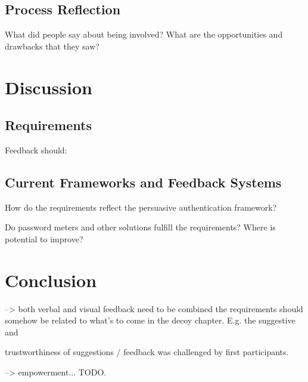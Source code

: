 \subsection{Process Reflection}
What did people say about being involved? What are the opportunities and drawbacks that they saw?
	
\section{Discussion}

\subsection{Requirements}
Feedback should:



\subsection{Current Frameworks and Feedback Systems}
How do the requirements reflect the persuasive authentication framework?

Do password meters and other solutions fulfill the requirements?
Where is potential to improve?



\section{Conclusion}



--> both verbal and visual feedback need to be combined
the requirements should somehow be related to what's to come in the decoy chapter. E.g. the suggestive and 

trustworthiness of suggestions / feedback was challenged by first participants.




--> empowerment... TODO.


\vspace*{1cm}\noindent
{}


